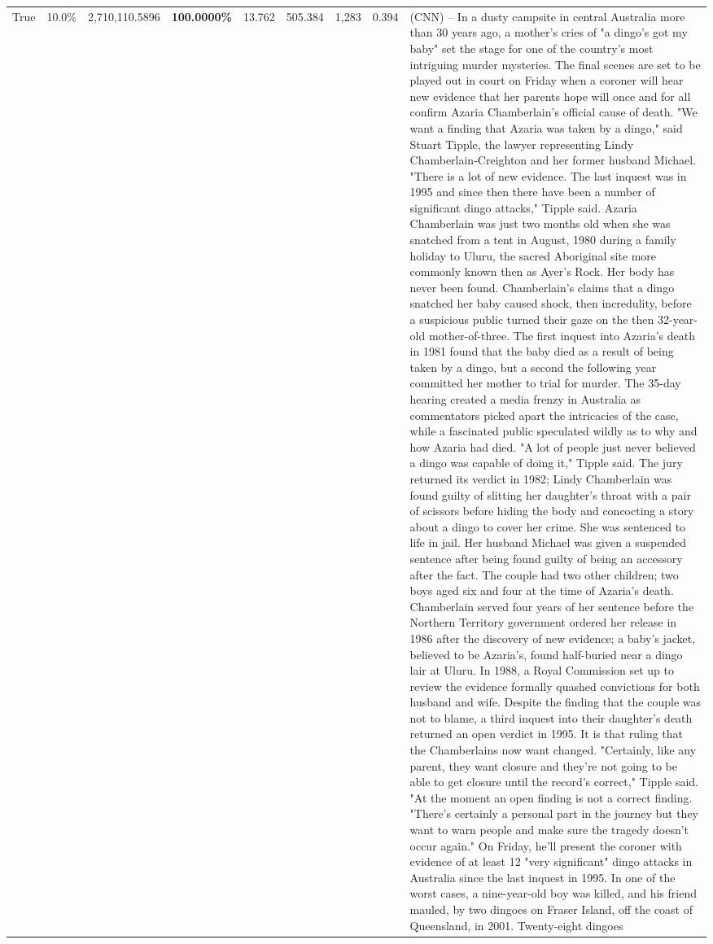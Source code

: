 \begin{table}[H]
\begin{tabular}{lllrlllll}
True & 10.0\% & 2,710,110.5896 & \bfseries \color{red} 100.0000\% & 13.762 & 505.384 & 1,283 & 0.394 & (CNN) -- In a dusty campsite in central Australia more than 30 years ago, a mother's cries of "a dingo's got my baby" set the stage for one of the country's most intriguing murder mysteries. The final scenes are set to be played out in court on Friday when a coroner will hear new evidence that her parents hope will once and for all confirm Azaria Chamberlain's official cause of death. "We want a finding that Azaria was taken by a dingo," said Stuart Tipple, the lawyer representing Lindy Chamberlain-Creighton and her former husband Michael. "There is a lot of new evidence. The last inquest was in 1995 and since then there have been a number of significant dingo attacks," Tipple said. Azaria Chamberlain was just two months old when she was snatched from a tent in August, 1980 during a family holiday to Uluru, the sacred Aboriginal site more commonly known then as Ayer's Rock. Her body has never been found. Chamberlain's claims that a dingo snatched her baby caused shock, then incredulity, before a suspicious public turned their gaze on the then 32-year-old mother-of-three. The first inquest into Azaria's death in 1981 found that the baby died as a result of being taken by a dingo, but a second the following year committed her mother to trial for murder. The 35-day hearing created a media frenzy in Australia as commentators picked apart the intricacies of the case, while a fascinated public speculated wildly as to why and how Azaria had died. "A lot of people just never believed a dingo was capable of doing it," Tipple said. The jury returned its verdict in 1982; Lindy Chamberlain was found guilty of slitting her daughter's throat with a pair of scissors before hiding the body and concocting a story about a dingo to cover her crime. She was sentenced to life in jail. Her husband Michael was given a suspended sentence after being found guilty of being an accessory after the fact. The couple had two other children; two boys aged six and four at the time of Azaria's death. Chamberlain served four years of her sentence before the Northern Territory government ordered her release in 1986 after the discovery of new evidence; a baby's jacket, believed to be Azaria's, found half-buried near a dingo lair at Uluru. In 1988, a Royal Commission set up to review the evidence formally quashed convictions for both husband and wife. Despite the finding that the couple was not to blame, a third inquest into their daughter's death returned an open verdict in 1995. It is that ruling that the Chamberlains now want changed. "Certainly, like any parent, they want closure and they're not going to be able to get closure until the record's correct," Tipple said. "At the moment an open finding is not a correct finding. "There's certainly a personal part in the journey but they want to warn people and make sure the tragedy doesn't occur again." On Friday, he'll present the coroner with evidence of at least 12 "very significant" dingo attacks in Australia since the last inquest in 1995. In one of the worst cases, a nine-year-old boy was killed, and his friend mauled, by two dingoes on Fraser Island, off the coast of Queensland, in 2001. Twenty-eight dingoes 
\end{tabular}
\end{table}
